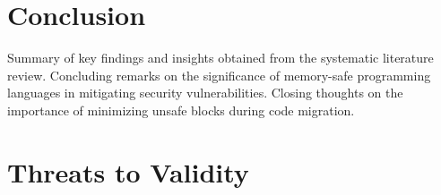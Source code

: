 \documentclass[sigconf]{acmart}
\begin{document}
\section{Conclusion}

Summary of key findings and insights obtained from the systematic literature review.
Concluding remarks on the significance of memory-safe programming languages in mitigating security vulnerabilities.
Closing thoughts on the importance of minimizing unsafe blocks during code migration.

\section{Threats to Validity}
\balance



\end{document}

